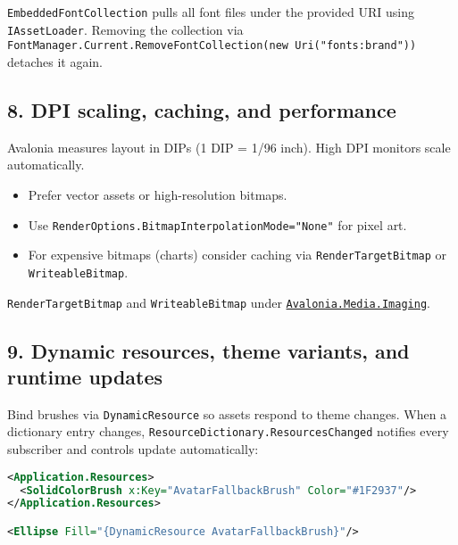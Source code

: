 \passthrough{\lstinline!EmbeddedFontCollection!} pulls all font files
under the provided URI using \passthrough{\lstinline!IAssetLoader!}.
Removing the collection via
\passthrough{\lstinline!FontManager.Current.RemoveFontCollection(new Uri("fonts:brand"))!}
detaches it again.

\subsection{8. DPI scaling, caching, and
performance}\label{dpi-scaling-caching-and-performance}

Avalonia measures layout in DIPs (1 DIP = 1/96 inch). High DPI monitors
scale automatically.

\begin{itemize}
\tightlist
\item
  Prefer vector assets or high-resolution bitmaps.
\item
  Use
  \passthrough{\lstinline!RenderOptions.BitmapInterpolationMode="None"!}
  for pixel art.
\item
  For expensive bitmaps (charts) consider caching via
  \passthrough{\lstinline!RenderTargetBitmap!} or
  \passthrough{\lstinline!WriteableBitmap!}.
\end{itemize}

\passthrough{\lstinline!RenderTargetBitmap!} and
\passthrough{\lstinline!WriteableBitmap!} under
\href{https://github.com/AvaloniaUI/Avalonia/tree/master/src/Avalonia.Base/Media/Imaging}{\passthrough{\lstinline!Avalonia.Media.Imaging!}}.

\subsection{9. Dynamic resources, theme variants, and runtime
updates}\label{dynamic-resources-theme-variants-and-runtime-updates}

Bind brushes via \passthrough{\lstinline!DynamicResource!} so assets
respond to theme changes. When a dictionary entry changes,
\passthrough{\lstinline!ResourceDictionary.ResourcesChanged!} notifies
every subscriber and controls update automatically:

\begin{lstlisting}[language=XML]
<Application.Resources>
  <SolidColorBrush x:Key="AvatarFallbackBrush" Color="#1F2937"/>
</Application.Resources>

<Ellipse Fill="{DynamicResource AvatarFallbackBrush}"/>
\end{lstlisting}

